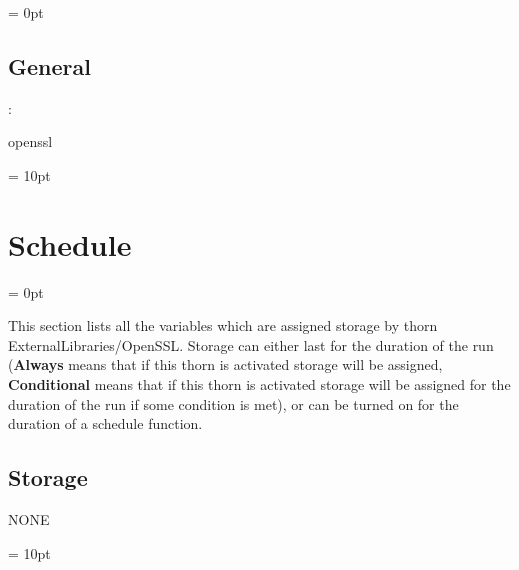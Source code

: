 \parskip = 0pt

\vspace{3mm} \subsection*{General}

: 

openssl
\vspace{2mm}

\vspace{5mm}\parskip = 10pt 

\section{Schedule} 


\parskip = 0pt


\noindent This section lists all the variables which are assigned storage by thorn ExternalLibraries/OpenSSL.  Storage can either last for the duration of the run ({\bf Always} means that if this thorn is activated storage will be assigned, {\bf Conditional} means that if this thorn is activated storage will be assigned for the duration of the run if some condition is met), or can be turned on for the duration of a schedule function.


\subsection*{Storage}NONE

\vspace{5mm}\parskip = 10pt 

